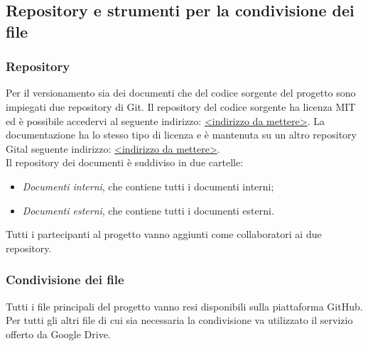 \subsection{Repository e strumenti per la condivisione dei file}
\subsubsection{Repository}
Per il versionamento sia dei documenti che del codice sorgente del progetto sono impiegati due repository di Git\texttrademark. Il repository del codice sorgente ha licenza MIT ed è possibile accedervi al seguente indirizzo: \url{<indirizzo da mettere>}.
La documentazione ha lo stesso tipo di licenza e è mantenuta su un altro repository Git\texttrademark al seguente indirizzo: \url{<indirizzo da mettere>}.\\
Il repository dei documenti è suddiviso in due cartelle: 
\begin{itemize}
	\item \textit{Documenti interni}, che contiene tutti i documenti interni;
	\item \textit{Documenti esterni}, che contiene tutti i documenti esterni.
\end{itemize}
Tutti i partecipanti al progetto vanno aggiunti come collaboratori ai due repository.

\subsubsection{Condivisione dei file}
Tutti i file principali del progetto vanno resi disponibili sulla piattaforma GitHub\texttrademark. Per tutti gli altri file di cui sia necessaria la condivisione va utilizzato il servizio offerto da Google Drive\texttrademark.

